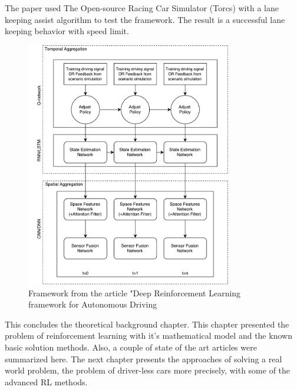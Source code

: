 The paper used The Open-source Racing Car Simulator (Torcs) with a lane keeping assist algorithm to test the framework. The result is a successful lane keeping behavior with speed limit.    

\begin{figure}[H]
	\centering
	\includegraphics[width=0.8\textwidth]{Figures/TheoreticalBackground/Framework_article}
	\caption{Framework from the article "Deep Reinforcement Learning framework for Autonomous Driving}
	\label{fig:Framework_article}
\end{figure}
 
This concludes the theoretical background chapter. This chapter presented the problem of reinforcement learning with it's mathematical model and the known basic solution methods. Also, a couple of state of the art articles were summarized here. The next chapter presents the approaches of solving a real world problem, the problem of driver-less cars more precisely, with some of the advanced RL methods.